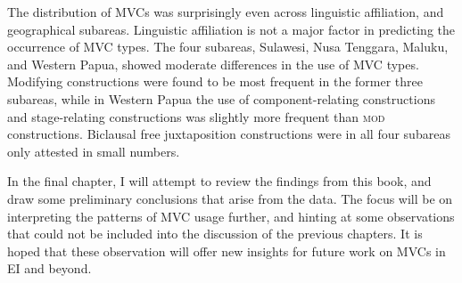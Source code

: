 The distribution of MVCs was surprisingly even across linguistic affiliation, and geographical subareas. Linguistic affiliation is not a major factor in predicting the occurrence of MVC types. The four subareas, Sulawesi, Nusa Tenggara, Maluku, and Western Papua, showed moderate differences in the use of MVC types. Modifying constructions were found to be most frequent in the former three subareas, while in Western Papua the use of component-relating constructions and stage-relating constructions was slightly more frequent than \textsc{mod} constructions. Biclausal free juxtaposition constructions were in all four subareas only attested in small numbers. 

In the final chapter, I will attempt to review the findings from this book, and draw some preliminary conclusions that arise from the data. The focus will be on interpreting the patterns of MVC usage further, and hinting at some observations that could not be included into the discussion of the previous chapters. It is hoped that these observation will offer new insights for future work on MVCs in EI and beyond.